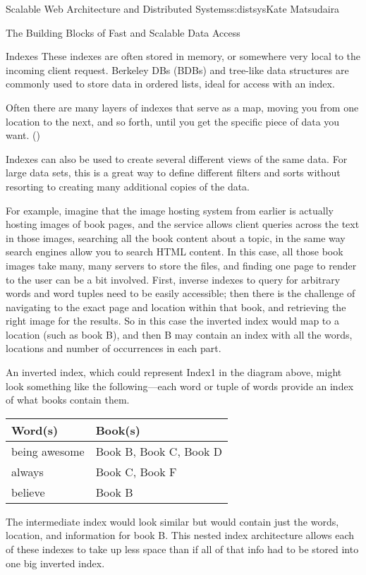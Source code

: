 \begin{aosachapter}{Scalable Web Architecture and Distributed Systems}{s:distsys}{Kate Matsudaira}
\begin{aosasect1}{The Building Blocks of Fast and Scalable Data Access}
\begin{aosasect2}{Indexes}
These indexes are often stored in memory, or somewhere very local to
the incoming client request. Berkeley DBs (BDBs) and tree-like
data structures are commonly used to store data in ordered lists,
ideal for access with an index.

Often there are many layers of indexes that serve as a
map, moving you from one location to the next, and so forth, until
you get the specific piece of data you want. ()


Indexes can also be used to create several different views of the same
data. For large data sets, this is a great way to define different
filters and sorts without resorting to creating many additional copies
of the data.

For example, imagine that the image hosting system from earlier is
actually hosting images of book pages, and the service allows client
queries across the text in those images, searching all the book
content about a topic, in the same way search engines allow you to
search HTML content. In this case, all those book images take many,
many servers to store the files, and finding one page to render to the
user can be a bit involved. First, inverse indexes to
query for arbitrary words and word tuples need to be easily
accessible; then there is the challenge of navigating to the exact
page and location within that book, and retrieving the right image for
the results. So in this case the inverted index would map to a
location (such as book B), and then B may contain an index with all
the words, locations and number of occurrences in each part.

An inverted index, which could represent Index1 in the diagram above,
might look something like the following---each word or tuple of words
provide an index of what books contain them.

\begin{tabular}{|l|l|}
\hline
Word(s) & Book(s) \\
\hline
being awesome & Book B, Book C, Book D \\
always & Book C, Book F \\
believe & Book B \\
\hline
\end{tabular}

The intermediate index would look similar but would contain just the
words, location, and information for book B. This nested index
architecture allows each of these indexes to take up less space than
if all of that info had to be stored into one big inverted index.


\end{aosasect2}
\end{aosasect1}
\end{aosachapter}
